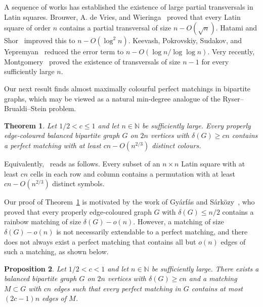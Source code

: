 \documentclass[11pt,reqno]{amsart}
\newtheorem{theorem}{Theorem}[section]
\newtheorem{conjecture}[theorem]{Conjecture}
\newtheorem{proposition}[theorem]{Proposition}
\theoremstyle{definition}
\theoremstyle{remark}
\renewcommand\geq{\geqslant}
\renewcommand\le{\leqslant}
\renewcommand\ge{\geqslant}
\begin{document}

A sequence of works has established the existence of large partial transversals in Latin squares.
Brouwer, A. de Vries, and Wieringa~\cite{BVW} proved that every Latin square of order $n$ contains a partial transversal of size $n - O(\sqrt{n})$.
Hatami and Shor~\cite{HS} improved this to $n - O(\log^2 n)$.
Keevash, Pokrovskiy, Sudakov, and Yepremyan~\cite{KPSY} reduced the error term to $n - O(\log n / \log\log n)$.
Very recently, Montgomery~\cite{Montgomery} proved the existence of transversals of size $n - 1$ for every sufficiently large $n$.

Our next result finds almost maximally colourful perfect matchings in bipartite graphs, which may be viewed as a natural min-degree analogue of the Ryser--Brualdi--Stein problem.

\begin{theorem}\label{thm:bipartite}
Let $1/2 < c \le 1$ and let $n\in\mathbb{N}$ be sufficiently large. Every properly edge-coloured balanced bipartite graph $G$ on $2n$ vertices with $\delta(G)\geq cn$ contains a perfect matching with at least
$cn - O(n^{2/3})$ distinct colours.
\end{theorem}

Equivalently,~ reads as follows. Every subset of an $n\times n$ Latin square with at least $cn$ cells in each row and column contains a permutation with at least $cn - O(n^{2/3})$ distinct symbols.

Our proof of Theorem~\ref{thm:bipartite} is motivated by the work of Gy\'{a}rf\'{a}s and S\'{a}rk\"{o}zy~\cite{GS}, who proved that every properly edge-coloured graph $G$ with $\delta(G) \le n/2$ contains a rainbow matching of size $\delta(G)-o(n)$.
However, a matching of size $\delta(G)-o(n)$ is not necessarily extendable to a perfect matching, and there does not always exist a perfect matching that contains all but $o(n)$ edges of such a matching, as shown below.

\begin{proposition}\label{Prop:construction2}
Let $1/2 < c < 1$ and let $n \in \mathbb{N}$ be sufficiently large. There exists a balanced bipartite graph $G$ on $2n$ vertices with $\delta(G) \ge cn$ and a matching $M\subset G$ with $cn$ edges such that every perfect matching in $G$ contains at most $(2c - 1)n$ edges of $M$.
\end{proposition}
\end{document}
